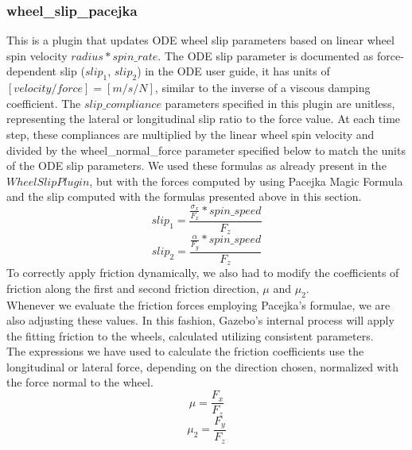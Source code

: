 \subsubsection{wheel\_slip\_pacejka}
This is a plugin that updates ODE wheel slip parameters based on linear wheel spin velocity $radius * spin\_rate$. The ODE slip parameter is documented as force-dependent slip ($slip_1$, $slip_2$) in the ODE user guide, it has units of $[velocity / force] = [m / s / N]$, similar to the inverse of a viscous damping coefficient.
The $slip\_compliance$ parameters specified in this plugin are unitless, representing the lateral or longitudinal slip ratio to the force value.
At each time step, these compliances are multiplied by the linear wheel spin velocity and divided by the wheel\_normal\_force parameter specified below to match the units of the ODE slip parameters.
We used these formulas as already present in the $WheelSlipPlugin$, but with the forces computed by using Pacejka Magic Formula and the slip computed with the formulas presented above in this section.
\[
	slip_1 = \frac{\frac{\sigma_x}{F_x} * spin\_speed}{F_z}
\]
\[
	slip_2 = \frac{\frac{\alpha}{F_y} * spin\_speed}{F_z}
\]
To correctly apply friction dynamically, we also had to modify the coefficients of friction along the first and second friction direction, $\mu$ and $\mu_2$.\\
Whenever we evaluate the friction forces employing Pacejka's formulae, we are also adjusting these values. In this fashion, Gazebo's internal process will apply the fitting friction to the wheels, calculated utilizing consistent parameters.\\
The expressions we have used to calculate the friction coefficients use the longitudinal or lateral force, depending on the direction chosen, normalized with the force normal to the wheel.
\[
	\mu = \frac{F_x}{F_z}
\]
\[
	\mu_2 = \frac{F_y}{F_z}
\]
